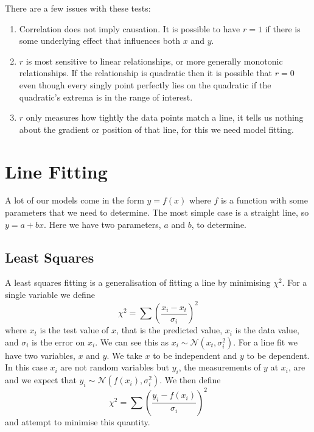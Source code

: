 \documentclass[a4paper]{article}
\newcommand{\distributed}{\sim}
\newcommand{\normal}{\mathcal{N}}
\begin{document}
    There are a few issues with these tests:
    \begin{enumerate}
        \item Correlation does not imply causation.
        It is possible to have \(r = 1\) if there is some underlying effect that influences both \(x\) and \(y\).
        \item \(r\) is most sensitive to linear relationships, or more generally monotonic relationships.
        If the relationship is quadratic then it is possible that \(r = 0\) even though every singly point perfectly lies on the quadratic if the quadratic's extrema is in the range of interest.
        \item \(r\) only measures how tightly the data points match a line, it tells us nothing about the gradient or position of that line, for this we need model fitting.
    \end{enumerate}
    
    \section{Line Fitting}
    A lot of our models come in the form \(y = f(x)\) where \(f\) is a function with some parameters that we need to determine.
    The most simple case is a straight line, so \(y = a + bx\).
    Here we have two parameters, \(a\) and \(b\), to determine.
    
    \subsection{Least Squares}
    A least squares fitting is a generalisation of fitting a line by minimising \(\chi^2\).
    For a single variable we define
    \[\chi^2 = \sum\left(\frac{x_i - x_t}{\sigma_i}\right)^2\]
    where \(x_t\) is the test value of \(x\), that is the predicted value, \(x_i\) is the data value, and \(\sigma_i\) is the error on \(x_i\).
    We can see this as \(x_i \distributed \normal(x_t, \sigma_i^2)\).
    For a line fit we have two variables, \(x\) and \(y\).
    We take \(x\) to be independent and \(y\) to be dependent.
    In this case \(x_i\) are not random variables but \(y_i\), the measurements of \(y\) at \(x_i\), are and we expect that \(y_i\distributed\normal(f(x_i), \sigma_i^2)\).
    We then define
    \[\chi^2 = \sum\left(\frac{y_i - f(x_i)}{\sigma_i}\right)^2\]
    and attempt to minimise this quantity.
    
\end{document}
